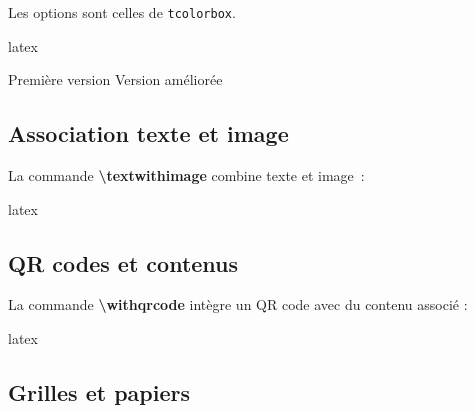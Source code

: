 \documentclass[
    french,
    margin=2cm
]{neoschool}
\begin{document}
Les options sont celles de \texttt{tcolorbox}.

\begin{code}{latex}
\begin{sidebyside}[
    title=Comparaison,
    colback=exampleColor!5,
    colbacklower=exampleColor!10
]
    Première version
    \tcblower
    Version améliorée
\end{sidebyside}
\end{code}

\subsection{Association texte et image}

La commande \textbf{\textbackslash textwithimage} combine texte et image~:

\begin{code}{latex}


\end{code}

\subsection{QR codes et contenus}

La commande \textbf{\textbackslash withqrcode} intègre un QR code avec
du contenu associé :

\begin{code}{latex}


\end{code}

\subsection{Grilles et papiers}
\end{document}
